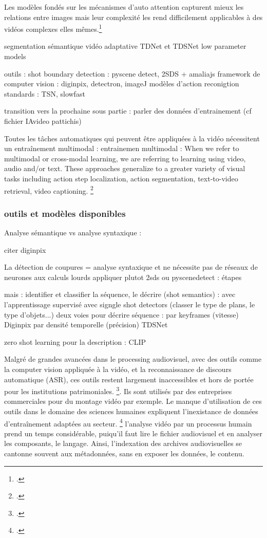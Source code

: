 Les modèles fondés sur les mécanismes d'auto attention capturent mieux les relations entre images mais leur complexité les rend difficilement applicables à des vidéos complexes elles mêmes.\footcite{yuan2025}

segmentation sémantique vidéo adaptative TDNet et TDSNet 
low parameter models 

outils : 
shot boundary detection : pyscene detect, 2SDS + amaliajs
framework de computer vision : diginpix, detectron, imageJ
modèles d'action reconigtion standards : TSN, slowfast


transition vers la prochaine sous partie : parler des données d'entrainement (cf fichier IAvideo pattichis)

Toutes les tâches automatiques qui peuvent être appliquées à la vidéo nécessitent un entraînement multimodal : 
entrainemen multimodal :  When we refer to multimodal or cross-modal learning, we are referring to learning using video, audio and/or text. These approaches generalize to a greater variety of visual tasks including action step localization, action segmentation, text-to-video retrieval, video captioning. \footcite{schiappa2023}


\subsubsection{outils et modèles disponibles}
Analyse sémantique vs analyse syntaxique : 

citer diginpix 

La détection de coupures = analyse syntaxique et ne nécessite pas de réseaux de neurones aux calculs lourds 
appliquer plutot 2sds ou pyscenedetect : étapes 

mais : identifier et classifier la séquence, le décrire (shot semantics) : avec l'apprentissage supervisé avec signgle shot detectors  (classer le type de plans, le type d'objets...)
deux voies pour décrire séquence : 
par keyframes (vitesse) Diginpix
par densité temporelle (précision) TDSNet

zero shot learning pour la description : CLIP 

Malgré de grandes avancées dans le processing audiovisuel, avec des outils comme la computer vision appliquée à la vidéo, et la reconnaissance de discours automatique (ASR), ces outils restent largement inaccessibles et hors de portée pour les institutions patrimoniales. \footcite{noord2021}. Ils sont utilisés par des entreprises commerciales pour du montage vidéo par exemple. Le manque d'utilisation de ces outils dans le domaine des sciences humaines expliquent l'inexistance de données d'entraînement adaptées au secteur. \footcite{noord2021} 
l'analyse vidéo par un processus humain prend un temps considérable, puiqu'il faut lire le fichier audiovisuel et en analyser les composants, le langage. Ainsi, l'indexation des archives audiovisuelles se cantonne souvent aux métadonnées, sans en exposer les données, le contenu.

